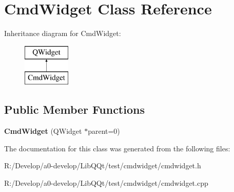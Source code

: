 \hypertarget{class_cmd_widget}{}\section{Cmd\+Widget Class Reference}
\label{class_cmd_widget}
Inheritance diagram for Cmd\+Widget\+:\begin{figure}[H]
\begin{center}
\leavevmode
\includegraphics[height=2.000000cm]{class_cmd_widget}
\end{center}
\end{figure}
\subsection*{Public Member Functions}
\begin{DoxyCompactItemize}
\item 
\mbox{\label{class_cmd_widget_a7c121950eb676a106dc5249730ed1ca6}} 
{\bfseries Cmd\+Widget} (Q\+Widget $\ast$parent=0)
\end{DoxyCompactItemize}


The documentation for this class was generated from the following files\+:\begin{DoxyCompactItemize}
\item 
R\+:/\+Develop/a0-\/develop/\+Lib\+Q\+Qt/test/cmdwidget/cmdwidget.\+h\item 
R\+:/\+Develop/a0-\/develop/\+Lib\+Q\+Qt/test/cmdwidget/cmdwidget.\+cpp\end{DoxyCompactItemize}
